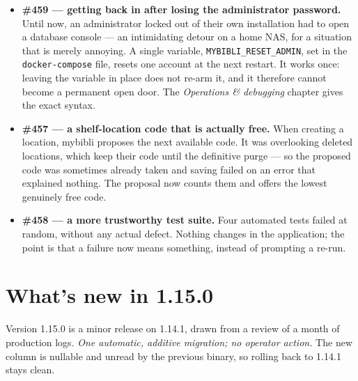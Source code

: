 \begin{itemize}
        A caveat worth stating plainly: a residue of titles remains
        that no consulted library holds \string— small-press and
        self-published works, chiefly British. Six catalogues have now
        been tried against them. For those, the fields must be filled
        by hand; no further update will change that.
  \item \textbf{\#459 \string— getting back in after losing the
        administrator password.} Until now, an administrator locked
        out of their own installation had to open a database console
        \string— an intimidating detour on a home NAS, for a situation
        that is merely annoying. A single variable,
        \texttt{MYBIBLI\_RESET\_ADMIN}, set in the
        \texttt{docker-compose} file, resets one account at the next
        restart. It works once: leaving the variable in place does not
        re-arm it, and it therefore cannot become a permanent open
        door. The \emph{Operations \& debugging} chapter gives the exact syntax.
  \item \textbf{\#457 \string— a shelf-location code that is actually
        free.} When creating a location, mybibli proposes the next
        available code. It was overlooking deleted locations, which
        keep their code until the definitive purge \string— so the
        proposed code was sometimes already taken and saving failed on
        an error that explained nothing. The proposal now counts them
        and offers the lowest genuinely free code.
  \item \textbf{\#458 \string— a more trustworthy test suite.} Four
        automated tests failed at random, without any actual defect.
        Nothing changes in the application; the point is that a
        failure now means something, instead of prompting a re-run.
\end{itemize}

\section{What's new in 1.15.0}\label{sec:whats-new-1.15.0}

Version 1.15.0 is a minor release on 1.14.1, drawn from a review of a
month of production logs. \emph{One automatic, additive migration; no
operator action.} The new column is nullable and unread by the previous
binary, so rolling back to 1.14.1 stays clean.


